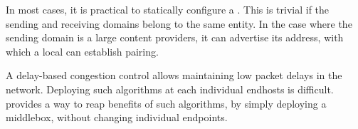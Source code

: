  
\label{s:impl:discovery}
In most cases, it is practical to statically configure a \pair. This is trivial if the sending and receiving domains belong to the same entity. In the case where the sending domain is a large content providers, it can advertise its \inbox address, with which a local \outbox can establish pairing. 






 A delay-based congestion control allows maintaining low packet delays in the network. Deploying such algorithms at each individual endhosts is difficult. \name provides a way to reap benefits of such algorithms, by simply deploying a middlebox, without changing individual endpoints.

